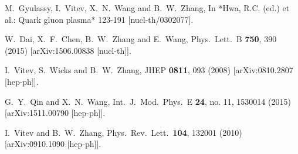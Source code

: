 \documentclass[3p,times,twocolumn]{elsarticle}
\begin{document}



%
%

\begin{thebibliography}{}


  M.~Gyulassy, I.~Vitev, X.~N.~Wang and B.~W.~Zhang,
  In *Hwa, R.C. (ed.) et al.: Quark gluon plasma* 123-191
  [nucl-th/0302077].

  W.~Dai, X.~F.~Chen, B.~W.~Zhang and E.~Wang,
  Phys.\ Lett.\ B {\bf 750}, 390 (2015)
  [arXiv:1506.00838 [nucl-th]].

  I.~Vitev, S.~Wicks and B.~W.~Zhang,
  JHEP {\bf 0811}, 093 (2008)
 [arXiv:0810.2807 [hep-ph]].

  G.~Y.~Qin and X.~N.~Wang,
  Int.\ J.\ Mod.\ Phys.\ E {\bf 24}, no. 11, 1530014 (2015)
  [arXiv:1511.00790 [hep-ph]].



  I.~Vitev and B.~W.~Zhang,
  Phys.\ Rev.\ Lett.\  {\bf 104}, 132001 (2010)
  [arXiv:0910.1090 [hep-ph]].


\end{thebibliography}
\end{document}
